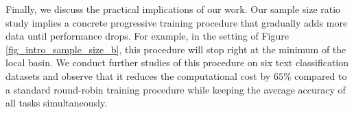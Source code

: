 



Finally, we discuss the practical implications of our work.
Our sample size ratio study implies a concrete progressive training procedure that gradually adds more data until performance drops.
For example, in the setting of Figure \ref{fig_intro_sample_size_b}, this procedure will stop right at the minimum of the local basin.
We conduct further studies of this procedure on six text classification datasets and observe that it reduces the computational cost by $65\%$ compared to a standard round-robin training procedure while keeping the average accuracy of all tasks simultaneously.

